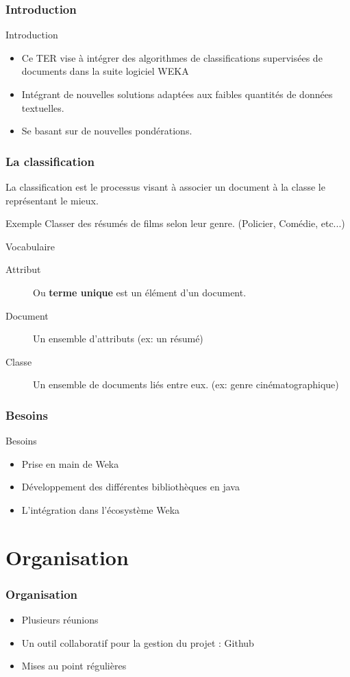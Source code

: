 \documentclass[12pt]{beamer}
\begin{document}
\begin{frame}
\frametitle{Introduction}
\begin{block}{Introduction}
\begin{itemize}
\item Ce TER vise à intégrer des algorithmes de classifications supervisées de documents dans la suite logiciel WEKA 
\item Intégrant de nouvelles solutions adaptées aux faibles quantités de données textuelles.
\item Se basant sur de nouvelles pondérations.
\end{itemize} 
\end{block}
\end{frame}
\begin{frame}
\frametitle{La classification}
La classification est le processus visant à associer un document à la classe le représentant le mieux.
\begin{block}{Exemple}
Classer des résumés de films selon leur genre. (Policier, Comédie, etc...)
\end{block}
\begin{block}{Vocabulaire}
\begin{description}
\item[Attribut] Ou \textbf{terme unique} est un élément d'un document.
\item[Document] Un ensemble d'attributs (ex: un résumé)
\item[Classe] Un ensemble de documents liés entre eux. (ex: genre cinématographique)
\end{description}
\end{block}


\end{frame}

\begin{frame}
\frametitle{Besoins}
\begin{block}{Besoins}
\begin{itemize}
\item Prise en main de Weka
\item Développement des différentes bibliothèques en java
\item L'intégration dans l’écosystème Weka
\end{itemize}
\end{block}

\end{frame}

\section{Organisation}
\begin{frame}
\frametitle{Organisation}
\begin{itemize}
	\item Plusieurs réunions
	\item Un outil collaboratif pour la gestion du projet : Github
	\item Mises au point régulières
\end{itemize}
\end{frame}
\end{document}
